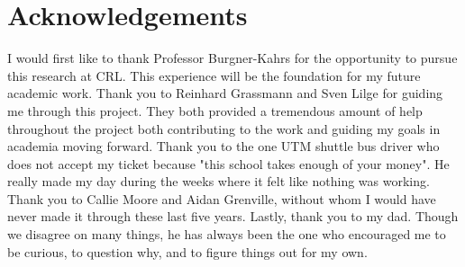 \section*{Acknowledgements}

I would first like to thank Professor Burgner-Kahrs for the opportunity to pursue this research at CRL. This experience will be the foundation for my future academic work. Thank you to Reinhard Grassmann and Sven Lilge for guiding me through this project. They both provided a tremendous amount of help throughout the project both contributing to the work and guiding my goals in academia moving forward. Thank you to the one UTM shuttle bus driver who does not accept my ticket because "this school takes enough of your money". He really made my day during the weeks where it felt like nothing was working. Thank you to Callie Moore and Aidan Grenville, without whom I would have never made it through these last five years. Lastly, thank you to my dad. Though we disagree on many things, he has always been the one who encouraged me to be curious, to question why, and to figure things out for my own. 
